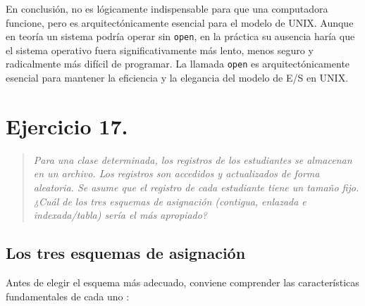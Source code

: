 \documentclass[12pt,letterpaper]{article}
\begin{document}
\medskip

\noindent
En conclusión, no es lógicamente indispensable para que una computadora funcione, pero es arquitectónicamente
esencial para el modelo de UNIX. Aunque en teoría un sistema podría operar sin \texttt{open}, en la práctica su
ausencia haría que el sistema operativo fuera significativamente más lento, menos seguro y radicalmente más
difícil de programar. La llamada \texttt{open} es arquitectónicamente esencial para mantener la eficiencia y la
elegancia del modelo de E/S en UNIX.

\newpage

\section*{Ejercicio 17.}

\begin{quote}
  \textit{Para una clase determinada, los registros de los estudiantes se almacenan en un archivo. Los registros
    son accedidos y actualizados de forma aleatoria. Se asume que el registro de cada estudiante tiene un tamaño
    fijo. ¿Cuál de los tres esquemas de asignación (contigua, enlazada e indexada/tabla) sería el más apropiado?}
\end{quote}

\bigskip

\subsection*{Los tres esquemas de asignación}
\noindent
Antes de elegir el esquema más adecuado, conviene comprender las características fundamentales de cada uno
\cite{tanenbaum2015,silberschatz2018}:
\end{document}
